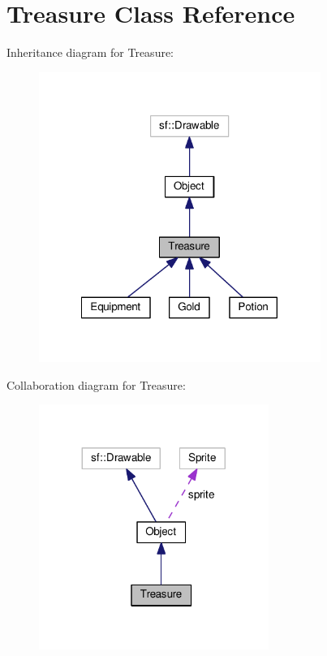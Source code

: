 \hypertarget{classTreasure}{\section{Treasure Class Reference}
\label{classTreasure}
}


Inheritance diagram for Treasure\+:
\nopagebreak
\begin{figure}[H]
\begin{center}
\leavevmode
\includegraphics[width=260pt]{classTreasure__inherit__graph}
\end{center}
\end{figure}


Collaboration diagram for Treasure\+:
\nopagebreak
\begin{figure}[H]
\begin{center}
\leavevmode
\includegraphics[width=212pt]{classTreasure__coll__graph}
\end{center}
\end{figure}
